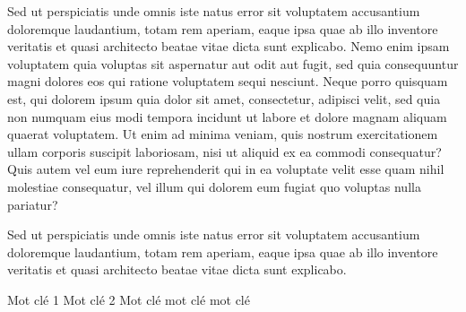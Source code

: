 \documentclass[french, english]{mythesis}
\begin{document}
	\begin{myabstract}[french]
	Sed ut perspiciatis unde omnis iste natus error sit voluptatem accusantium doloremque laudantium, totam rem aperiam, eaque ipsa quae ab illo inventore veritatis et quasi architecto beatae vitae dicta sunt explicabo. Nemo enim ipsam voluptatem quia voluptas sit aspernatur aut odit aut fugit, sed quia consequuntur magni dolores eos qui ratione voluptatem sequi nesciunt. Neque porro quisquam est, qui dolorem ipsum quia dolor sit amet, consectetur, adipisci velit, sed quia non numquam eius modi tempora incidunt ut labore et dolore magnam aliquam quaerat voluptatem. Ut enim ad minima veniam, quis nostrum exercitationem ullam corporis suscipit laboriosam, nisi ut aliquid ex ea commodi consequatur? Quis autem vel eum iure reprehenderit qui in ea voluptate velit esse quam nihil molestiae consequatur, vel illum qui dolorem eum fugiat quo voluptas nulla pariatur?

		\begin{mylaysummary}
		Sed ut perspiciatis unde omnis iste natus error sit voluptatem accusantium doloremque laudantium, totam rem aperiam, eaque ipsa quae ab illo inventore veritatis et quasi architecto beatae vitae dicta sunt explicabo.
		\end{mylaysummary}
		
		\begin{mykeywords}
			\mykeyword Mot clé 1
			\mykeyword Mot clé 2
			\mykeyword Mot clé mot clé mot clé
		\end{mykeywords}
		
	\end{myabstract}
	\mytoc
	
\end{document}
